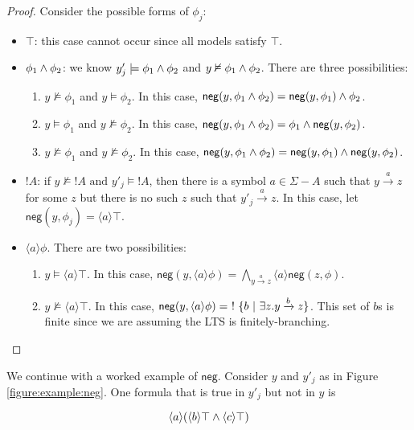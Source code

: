 \begin{proof}
Consider the possible forms of $\phi_j$:
\begin{itemize}
\item
$\top$: this case cannot occur since all models satisfy $\top$.
\item
$\phi_1 \land \phi_2$: we know $y'_j \models \phi_1 \land \phi_2$ and $y \nvDash \phi_1 \land \phi_2$. There are three possibilities:
\begin{enumerate}
\item
$y \nvDash \phi_1$ and $y \models \phi_2$. In this case, $\mathsf{neg}(y, \phi_1 \land \phi_2) = \mathsf{neg}(y, \phi_1) \land \phi_2$.
\item
$y \models \phi_1$ and $y \nvDash \phi_2$. In this case, $\mathsf{neg}(y, \phi_1 \land \phi_2) = \phi_1 \land \mathsf{neg}(y, \phi_2)$.
\item
$y \nvDash \phi_1$ and $y \nvDash \phi_2$. In this case, $\mathsf{neg}(y, \phi_1 \land \phi_2) =  \mathsf{neg}(y, \phi_1) \land \mathsf{neg}(y, \phi_2)$.
\end{enumerate}
\item
$!A$: if $y \nvDash !A \mbox{ and } y'_j \models !A$, then there is a symbol $a \in \Sigma-A$ such that $y \xrightarrow{a} z$ for some $z$ but there is no such $z$ such that $y'_j \xrightarrow{a} z$. In this case, let $\mathsf{neg}(y, \phi_j) = \langle a \rangle \top$.
\item
$\langle a \rangle \phi$. There are two possibilities:
\begin{enumerate}
\item
$y \models \langle a \rangle \top$. In this case, $\mathsf{neg}(y, \langle a \rangle \phi) =  \bigwedge\limits_{y \xrightarrow{a} z}  \langle a \rangle \mathsf{neg}(z, \phi)$.
\item
$y \nvDash \langle a \rangle \top$. In this case, $\mathsf{neg}(y, \langle a \rangle \phi) = \ ! \  \{ b \ | \  \exists z. y \xrightarrow{b} z\}$. This set of $b$s is finite since we are assuming the LTS is finitely-branching.
\end{enumerate}
\end{itemize}

\end{proof}



\NI We continue with a worked example of $\mathsf{neg}$.  Consider
  $y$ and $y'_j$ as in Figure \ref{figure:example:neg}.  One formula
  that is true in $y'_j$ but not in $y$ is

\[
   \langle a \rangle (\langle b \rangle \top \land \langle c \rangle \top)
\]


